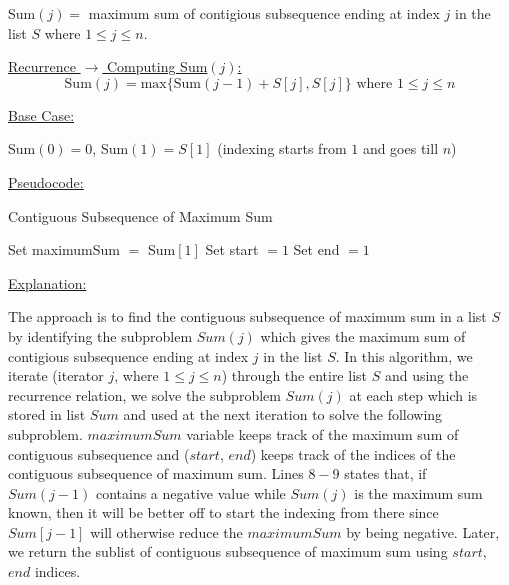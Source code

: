 \documentclass[letterpaper,11pt]{article}
\begin{document}
Sum$(j) =$ maximum sum of contigious subsequence ending at index $j$ in the list $S$ where $1 \leq j \leq n$.

\underline{Recurrence $\rightarrow$ Computing Sum$(j)$:} \[ \text{Sum}(j) = \text{max} \{\text{Sum}(j-1) + S[j], S[j]\} \text{ where } 1 \leq j \leq n \] 

\underline{Base Case:}

Sum$(0) = 0$, Sum$(1) = S[1]$ (indexing starts from $1$ and goes till $n$)

\underline{Pseudocode:}

\begin{algorithm}
    
    \caption{Contiguous Subsequence of Maximum Sum}
    

    
    Set maximumSum $=$ Sum$[1]$ 
    Set start $= 1$ 
    Set end $= 1$ 
    
\end{algorithm}

\underline{Explanation:}

The approach is to find the contiguous subsequence of maximum sum in a list $S$ by identifying the subproblem $Sum(j)$ which gives the maximum sum of contigious subsequence ending at index $j$ in the list $S$. In this algorithm, we iterate (iterator $j$, where $1 \leq j \leq n$) through the entire list $S$ and using the recurrence relation, we solve the subproblem $Sum(j)$ at each step which is stored in list $Sum$ and used at the next iteration to solve the following subproblem. $maximumSum$ variable keeps track of the maximum sum of contiguous subsequence and ($start$, $end$) keeps track of the indices of the contiguous subsequence of maximum sum. Lines $8-9$ states that, if $Sum(j-1)$ contains a negative value while $Sum(j)$ is the maximum sum known, then it will be better off to start the indexing from there since $Sum[j-1]$ will otherwise reduce the $maximumSum$ by being negative. Later, we return the sublist of contiguous subsequence of maximum sum using $start$, $end$ indices.
\end{document}

